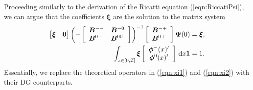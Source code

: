 Proceeding similarly to the derivation of the Ricatti equation (\ref{eqn:RiccatiPsi}), we can argue that the coefficients \( {\boldsymbol{\xi}}\) are the solution to the matrix system 
% 	 
	\begin{align*}
		\begin{bmatrix}  {\boldsymbol{\xi}}  & \boldsymbol{0} \end{bmatrix}\left(-\left[\begin{array}{ll} 
			 { {\boldsymbol B}}^{--} &  { {\boldsymbol B}}^{-0} \\
                         { {\boldsymbol B}}^{0-} &  { {\boldsymbol B}}^{00} 
		\end{array} \right]\right)^{-1}\left[\begin{array}{l} 
			 { {\boldsymbol B}}^{-+} \\ 
			 { {\boldsymbol B}}^{0+}
		\end{array} \right]\boldsymbol \Psi(0) & =  {\boldsymbol{\xi}}, \\ 
		\int_{x\in[0,\mathcal I]} {\boldsymbol \xi}\left[\begin{array}{c}\boldsymbol \phi^-(x)'{} \\ \boldsymbol \phi^0(x)'{}\end{array}\right]\, \mathrm{d} x \boldsymbol 1 & = 1. 
	\end{align*} 
Essentially, we replace the theoretical operators in (\ref{eqn:xi1}) and (\ref{eqn:xi2}) with their DG counterparts. 

